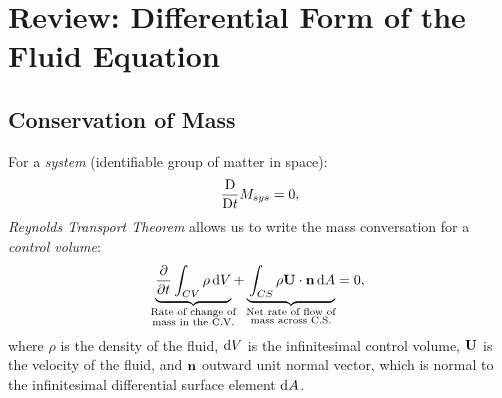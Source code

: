 \setcounter{chapter}{-1}
\chapter{Review: Differential Form of the Fluid Equation}

\section{Conservation of Mass}

For a \emph{system} (identifiable group of matter in space):
%
\begin{equation}
	\frac{\mathop{}\!\mathrm{D}}{\mathop{}\!\mathrm{D} t}{M_{sys}} = 0,
	\label{eq:mass-conversation}
\end{equation}
%
\emph{Reynolds Transport Theorem} allows us to write the mass conversation for a \emph{control volume}:
\begin{equation}
  \underbrace{\vphantom{\f{\p}{\rho}} \f{\p}{\p t} \int_{CV}{\rho \d V} }_{\mathclap{\substack{\text{Rate of change of} \\ \text{mass in the C.V.}}}}
	+
  \underbrace{\vphantom{\f{\p}{\rho}}\int_{CS}{\rho \mb{U} \cdot \mb{n} \d A}}_{\mathclap{\substack{\text{Net rate of flow of} \\ \text{mass across C.S.}}}}
	= 0,
	\label{eq:reynolds-transport-theorem}
\end{equation}
%
where \(\rho\) is the density of the fluid, \(\mathop{}\!\mathrm{d} V\) is the infinitesimal control volume, \(\mathbf{U}\) is the velocity of the fluid, and \(\mathbf{n}\) outward unit normal vector, which is normal to the infinitesimal differential surface element \(\mathop{}\!\mathrm{d} A\).

